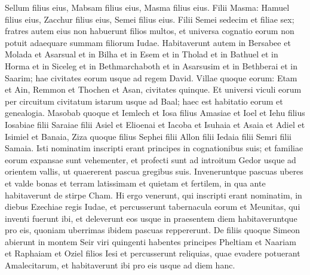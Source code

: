 \begin{biblechapter}
\verse Sellum filius eius, Mabsam filius eius, Masma filius eius. 
\verse Filii Masma: Hamuel filius eius, Zacchur filius eius, Semei filius eius. 
\verse Filii Semei sedecim et filiae sex; fratres autem eius non habuerunt filios multos, et universa cognatio eorum non potuit adaequare summam filiorum Iudae. 
\verse Habitaverunt autem in Bersabee et Molada et Asarsual 
\verse et in Bilha et in Esem et in Tholad 
\verse et in Bathuel et in Horma et in Siceleg 
\verse et in Bethmarchaboth et in Asarsusim et in Bethberai et in Saarim; hae civitates eorum usque ad regem David. 
\verse Villae quoque eorum: Etam et Ain, Remmon et Thochen et Asan, civitates quinque. 
\verse Et universi viculi eorum per circuitum civitatum istarum usque ad Baal; haec est habitatio eorum et genealogia. 
\verse Masobab quoque et Iemlech et Iosa filius Amasiae 
\verse et Ioel et Iehu filius Iosabiae filii Saraiae filii Asiel 
\verse et Elioenai et Iacoba et Isuhaia et Asaia et Adiel et Isimiel et Banaia, 
\verse Ziza quoque filius Sephei filii Allon filii Iedaia filii Semri filii Samaia. 
\verse Isti nominatim inscripti erant principes in cognationibus suis; et familiae eorum expansae sunt vehementer, 
\verse et profecti sunt ad introitum Gedor usque ad orientem vallis, ut quaererent pascua gregibus suis. 
\verse Inveneruntque pascuas uberes et valde bonas et terram latissimam et quietam et fertilem, in qua ante habitaverunt de stirpe Cham. 
\verse Hi ergo venerunt, qui inscripti erant nominatim, in diebus Ezechiae regis Iudae, et percusserunt tabernacula eorum et Meunitas, qui inventi fuerunt ibi, et deleverunt eos usque in praesentem diem habitaveruntque pro eis, quoniam uberrimas ibidem pascuas reppererunt. 
\verse De filiis quoque Simeon abierunt in montem Seir viri quingenti habentes principes Pheltiam et Naariam et Raphaiam et Oziel filios Iesi 
\verse et percusserunt reliquias, quae evadere potuerant Amalecitarum, et habitaverunt ibi pro eis usque ad diem hanc. 
\end{biblechapter}

